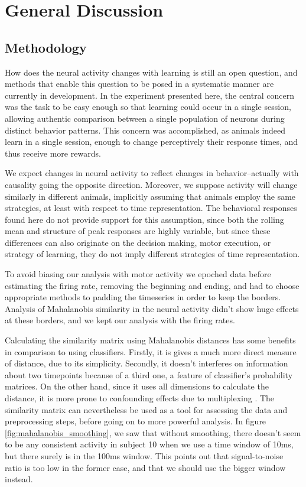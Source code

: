 \chapter{General Discussion}
\label{chap:results}

\section{Methodology}
How does the neural activity changes with learning is still an open question, and methods that enable this question to be posed in a systematic manner are currently in development. In the experiment presented here, the central concern was the task to be easy enough so that learning could occur in a single session, allowing authentic comparison between a single population of neurons during distinct behavior patterns. This concern was accomplished, as animals indeed learn in a single session, enough to change perceptively their response times, and thus receive more rewards. 

We expect changes in neural activity to reflect changes in behavior--actually with causality going the opposite direction. Moreover, we suppose activity will change similarly in different animals, implicitly assuming that animals employ the same strategies, at least with respect to time representation. The behavioral responses found here do not provide support for this assumption, since both the rolling mean and structure of peak responses are highly variable, but since these differences can also originate on the decision making, motor execution, or strategy of learning, they do not imply different strategies of time representation.

To avoid biasing our analysis with motor activity we epoched data before estimating the firing rate, removing the beginning and ending, and had to choose appropriate methods to padding the timeseries in order to keep the borders. Analysis of Mahalanobis similarity in the neural activity didn't show huge effects at these borders, and we kept our analysis with the firing rates. 

Calculating the similarity matrix using Mahalanobis distances has some benefits in comparison to using classifiers. Firstly, it is gives a much more direct measure of distance, due to its simplicity. Secondly, it doesn't interferes on information about two timepoints because of a third one, a feature of classifier's probability matrices. On the other hand, since it uses all dimensions to calculate the distance, it is more prone to confounding effects due to multiplexing \cite{gu2015oscillatory}. The similarity matrix can nevertheless be used as a tool for assessing the data and preprocessing steps, before going on to more powerful analysis. In figure \ref{fig:mahalanobis_smoothing}, we saw that without smoothing, there doesn't seem to be any consistent activity in subject 10 when we use a time window of 10ms, but there surely is in the 100ms window. This points out that signal-to-noise ratio is too low in the former case, and that we should use the bigger window instead. %

